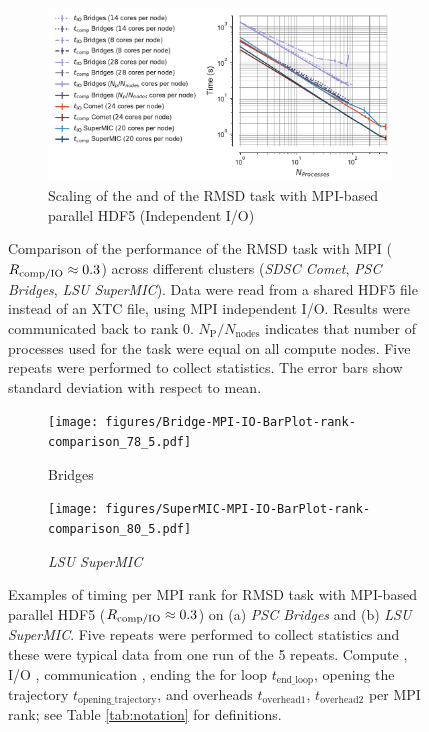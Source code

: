 \begin{figure}[!htb]
  \begin{subfigure} {.8\textwidth}
    \includegraphics[width=\linewidth]{figures/Clusters_IO_compute_scaling.pdf}
    \captionsetup{format=hang}
    \caption{Scaling of the \tcomp and \tIO of the RMSD task with MPI-based parallel HDF5 (Independent I/O)}
    \label{fig:compute-IO-scaling-clusters}
  \end{subfigure}
  \caption{Comparison of the performance of the RMSD task with MPI ($R_{\text{comp/IO}} \approx 0.3$)  across different clusters (\emph{SDSC Comet}, \emph{PSC Bridges}, \emph{LSU SuperMIC}).
    Data were read from a shared HDF5 file instead of an XTC file, using MPI independent I/O.
    Results were communicated back to rank 0.
    $N_{\text{P}}/N_{\text{nodes}}$ indicates that number of processes used for the task were equal on all compute nodes.
    Five repeats were performed to collect statistics.
    The error bars show standard deviation with respect to mean.}
\label{fig:MPIwithIO-clusters}
\end{figure} 

\begin{figure}[!htb]
  \centering
  \begin{subfigure}{.45\textwidth}
    \texttt{[image: figures/Bridge-MPI-IO-BarPlot-rank-comparison\_78\_5.pdf]}
    \caption{Bridges}
    \label{fig:hdf5-bridge}
  \end{subfigure}
  \bigskip
  \begin{subfigure} {.45\textwidth}
    \texttt{[image: figures/SuperMIC-MPI-IO-BarPlot-rank-comparison\_80\_5.pdf]}
    \caption{\emph{LSU SuperMIC}}
    \label{fig:hdf5-SuperMIC}
  \end{subfigure}
  \caption{Examples of timing per MPI rank for RMSD task with MPI-based parallel HDF5 ($R_{\text{comp/IO}} \approx 0.3$) on (a) \emph{PSC Bridges} and (b) \emph{LSU SuperMIC}.
    Five repeats were performed to collect statistics and these were typical data from one run of the 5 repeats. Compute \tcomp, I/O \tIO, communication \tcomm, ending the for loop $t_{\text{end\_loop}}$,  opening the trajectory $t_{\text{opening\_trajectory}}$, and overheads $t_{\text{overhead1}}$, $t_{\text{overhead2}}$ per MPI rank; see Table \ref{tab:notation} for definitions.}
  \label{fig:MPIwithIO-clusters-rank}
\end{figure} 

